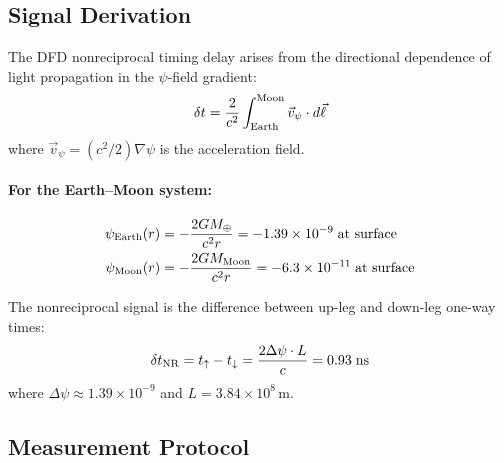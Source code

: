 \documentclass[11pt]{article}
\begin{document}
\subsection{Signal Derivation}

The DFD nonreciprocal timing delay arises from the directional
dependence of light propagation in the $\psi$-field gradient:
\begin{equation}
\delta t = \frac{2}{c^2} \int_{\rm Earth}^{\rm Moon}
\vec{v}_\psi \cdot d\vec{\ell}
\end{equation}
where $\vec{v}_\psi = (c^2/2)\nabla\psi$ is the acceleration field.

\paragraph{For the Earth--Moon system:}
\begin{align}
\psi_{\rm Earth}(r) &= -\frac{2GM_\oplus}{c^2 r}
= -1.39 \times 10^{-9} \;\text{at surface} \\
\psi_{\rm Moon}(r) &= -\frac{2GM_{\rm Moon}}{c^2 r}
= -6.3 \times 10^{-11} \;\text{at surface}
\end{align}

The nonreciprocal signal is the difference between up-leg and down-leg
one-way times:
\begin{equation}
\delta t_{\rm NR} = t_{\uparrow} - t_{\downarrow}
= \frac{2\Delta\psi \cdot L}{c} = 0.93\;\text{ns}
\end{equation}
where $\Delta\psi \approx 1.39 \times 10^{-9}$ and $L = 3.84 \times 10^8$\,m.

\subsection{Measurement Protocol}
\end{document}
